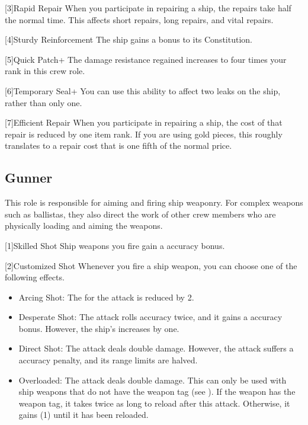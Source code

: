         [3]{Rapid Repair} When you participate in repairing a ship, the repairs take half the normal time.
        This affects short repairs, long repairs, and vital repairs.

        [4]{Sturdy Reinforcement} The ship gains a  bonus to its Constitution.

        [5]{Quick Patch+} The damage resistance regained increases to four times your rank in this crew role.

        [6]{Temporary Seal+} You can use this ability to affect two leaks on the ship, rather than only one.

        [7]{Efficient Repair} When you participate in repairing a ship, the cost of that repair is reduced by one item rank.
        If you are using gold pieces, this roughly translates to a repair cost that is one fifth of the normal price.

    \subsection{Gunner}
        This role is responsible for aiming and firing ship weaponry.
        For complex weapons such as ballistas, they also direct the work of other crew members who are physically loading and aiming the weapons.

        [1]{Skilled Shot} Ship weapons you fire gain a  accuracy bonus.

        [2]{Customized Shot} Whenever you fire a ship weapon, you can choose one of the following effects.
        \begin{itemize}
            \item Arcing Shot: The  for the attack is reduced by 2.
            \item Desperate Shot: The attack rolls accuracy twice, and it gains a  accuracy bonus.
                However, the ship's  increases by one.
            \item Direct Shot: The attack deals double damage.
                However, the attack suffers a  accuracy penalty, and its range limits are halved.
            \item Overloaded: The attack deals double damage.
                This can only be used with ship weapons that do not have the  weapon tag (see ).
                If the weapon has the  weapon tag, it takes twice as long to reload after this attack.
                Otherwise, it gains  (1) until it has been reloaded.
        \end{itemize}


